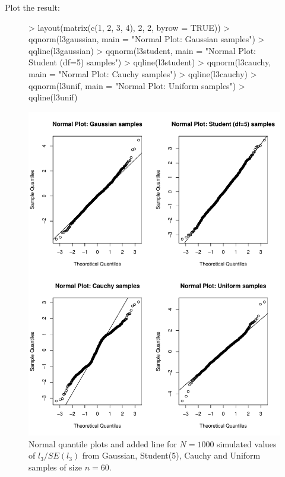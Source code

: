 \documentclass[a4paper]{article}
\begin{document}
Plot the result:
\begin{figure}
\begin{center}
\begin{Schunk}
\begin{Sinput}
> layout(matrix(c(1, 2, 3, 4), 2, 2, byrow = TRUE))
> qqnorm(l3gaussian, main = "Normal Plot: Gaussian samples")
> qqline(l3gaussian)
> qqnorm(l3student, main = "Normal Plot: Student (df=5) samples")
> qqline(l3student)
> qqnorm(l3cauchy, main = "Normal Plot: Cauchy samples")
> qqline(l3cauchy)
> qqnorm(l3unif, main = "Normal Plot: Uniform samples")
> qqline(l3unif)
\end{Sinput}
\end{Schunk}
\includegraphics{Fig1ElamirSeheult-017}
\end{center}
\caption{Normal quantile plots and added line for $N=1000$ simulated values of $l_3/SE(l_3)$ from Gaussian, Student(5), Cauchy and Uniform samples of size $n=60$.}
\end{figure}
\end{document}
